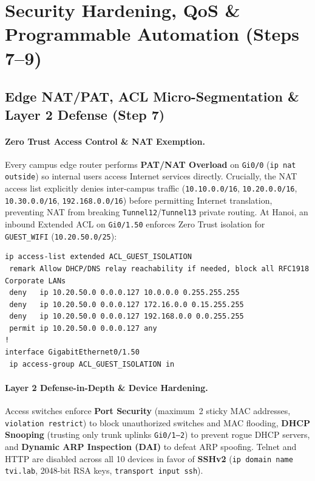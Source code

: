 \section{Security Hardening, QoS \& Programmable Automation (Steps 7--9)}

\subsection{Edge NAT/PAT, ACL Micro-Segmentation \& Layer 2 Defense (Step 7)}
\paragraph{Zero Trust Access Control \& NAT Exemption.}
Every campus edge router performs \textbf{PAT/NAT Overload} on \texttt{Gi0/0} (\texttt{ip nat outside}) so internal users access Internet services directly. Crucially, the NAT access list explicitly denies inter-campus traffic (\texttt{10.10.0.0/16}, \texttt{10.20.0.0/16}, \texttt{10.30.0.0/16}, \texttt{192.168.0.0/16}) before permitting Internet translation, preventing NAT from breaking \texttt{Tunnel12}/\texttt{Tunnel13} private routing. At Hanoi, an inbound Extended ACL on \texttt{Gi0/1.50} enforces Zero Trust isolation for \texttt{GUEST\_WIFI} (\texttt{10.20.50.0/25}):

\begin{lstlisting}[style=CiscoCLI, caption={Extended ACL Isolating Hanoi Guest Wi-Fi (VLAN 50) from Corporate Networks.}]
ip access-list extended ACL_GUEST_ISOLATION
 remark Allow DHCP/DNS relay reachability if needed, block all RFC1918 Corporate LANs
 deny   ip 10.20.50.0 0.0.0.127 10.0.0.0 0.255.255.255
 deny   ip 10.20.50.0 0.0.0.127 172.16.0.0 0.15.255.255
 deny   ip 10.20.50.0 0.0.0.127 192.168.0.0 0.0.255.255
 permit ip 10.20.50.0 0.0.0.127 any
!
interface GigabitEthernet0/1.50
 ip access-group ACL_GUEST_ISOLATION in
\end{lstlisting}

\paragraph{Layer 2 Defense-in-Depth \& Device Hardening.}
Access switches enforce \textbf{Port Security} (maximum~2 sticky MAC addresses, \texttt{violation restrict}) to block unauthorized switches and MAC flooding, \textbf{DHCP Snooping} (trusting only trunk uplinks \texttt{Gi0/1--2}) to prevent rogue DHCP servers, and \textbf{Dynamic ARP Inspection (DAI)} to defeat ARP spoofing. Telnet and HTTP are disabled across all 10 devices in favor of \textbf{SSHv2} (\texttt{ip domain name tvi.lab}, 2048-bit RSA keys, \texttt{transport input ssh}).

